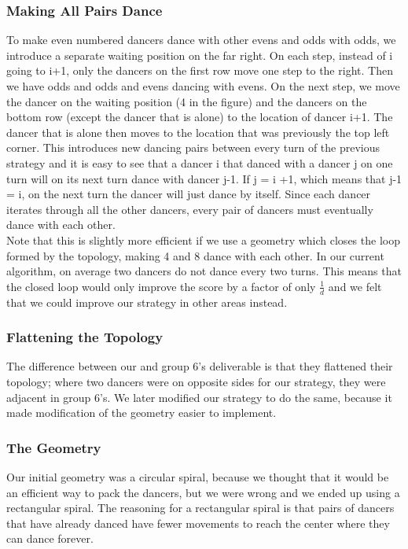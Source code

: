 \subsubsection{Making All Pairs Dance}
To make even numbered dancers dance with other evens and odds with odds, we introduce a separate waiting position on the far right. On each step, instead of i going to i+1, only the dancers on the first row move one step to the right. Then we have odds and odds and evens dancing with evens. On the next step, we move the dancer on the waiting position (4 in the figure) and the dancers on the bottom row (except the dancer that is alone) to the location of dancer i+1. The dancer that is alone then moves to the location that was previously the top left corner. This introduces new dancing pairs between every turn of the previous strategy and it is easy to see that a dancer i that danced with a dancer j on one turn will on its next turn dance with dancer j-1. If j = i +1, which means that j-1 = i, on the next turn the dancer will just dance by itself. Since each dancer iterates through all the other dancers, every pair of dancers must eventually dance with each other.\\
Note that this is slightly more efficient if we use a geometry which closes the loop formed by the topology, making 4 and 8 dance with each other. In our current algorithm, on average two dancers do not dance every two turns. This means that the closed loop would only improve the score by a factor of only $\frac{1}{d}$ and we felt that we could improve our strategy in other areas instead.\\
\subsubsection{Flattening the Topology}
The difference between our and group 6's deliverable is that they flattened their topology; where two dancers were on opposite sides for our strategy, they were adjacent in group 6's. We later modified our strategy to do the same, because it made modification of the geometry easier to implement.\\
\subsubsection{The Geometry}
Our initial geometry was a circular spiral, because we thought that it would be an efficient way to pack the dancers, but we were wrong and we ended up using a rectangular spiral. The reasoning for a rectangular spiral is that pairs of dancers that have already danced have fewer movements to reach the center where they can dance forever.\\
